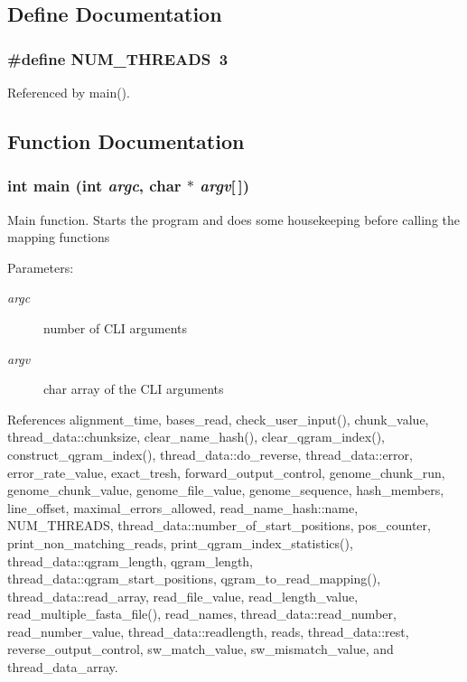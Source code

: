 \subsection{Define Documentation}
\subsubsection[{NUM\_\-THREADS}]{\setlength{\rightskip}{0pt plus 5cm}\#define NUM\_\-THREADS~3}\label{saruman_8c_7735206bdfad487588bba2126b806ab7}




Referenced by main().

\subsection{Function Documentation}
\subsubsection[{main}]{\setlength{\rightskip}{0pt plus 5cm}int main (int {\em argc}, \/  char $\ast$ {\em argv}[$\,$])}\label{saruman_8c_0ddf1224851353fc92bfbff6f499fa97}


Main function. Starts the program and does some housekeeping before calling the mapping functions \begin{Desc}
\item[Parameters:]
\begin{description}
\item[{\em argc}]number of CLI arguments \item[{\em argv}]char array of the CLI arguments \end{description}
\end{Desc}


References alignment\_\-time, bases\_\-read, check\_\-user\_\-input(), chunk\_\-value, thread\_\-data::chunksize, clear\_\-name\_\-hash(), clear\_\-qgram\_\-index(), construct\_\-qgram\_\-index(), thread\_\-data::do\_\-reverse, thread\_\-data::error, error\_\-rate\_\-value, exact\_\-tresh, forward\_\-output\_\-control, genome\_\-chunk\_\-run, genome\_\-chunk\_\-value, genome\_\-file\_\-value, genome\_\-sequence, hash\_\-members, line\_\-offset, maximal\_\-errors\_\-allowed, read\_\-name\_\-hash::name, NUM\_\-THREADS, thread\_\-data::number\_\-of\_\-start\_\-positions, pos\_\-counter, print\_\-non\_\-matching\_\-reads, print\_\-qgram\_\-index\_\-statistics(), thread\_\-data::qgram\_\-length, qgram\_\-length, thread\_\-data::qgram\_\-start\_\-positions, qgram\_\-to\_\-read\_\-mapping(), thread\_\-data::read\_\-array, read\_\-file\_\-value, read\_\-length\_\-value, read\_\-multiple\_\-fasta\_\-file(), read\_\-names, thread\_\-data::read\_\-number, read\_\-number\_\-value, thread\_\-data::readlength, reads, thread\_\-data::rest, reverse\_\-output\_\-control, sw\_\-match\_\-value, sw\_\-mismatch\_\-value, and thread\_\-data\_\-array.

